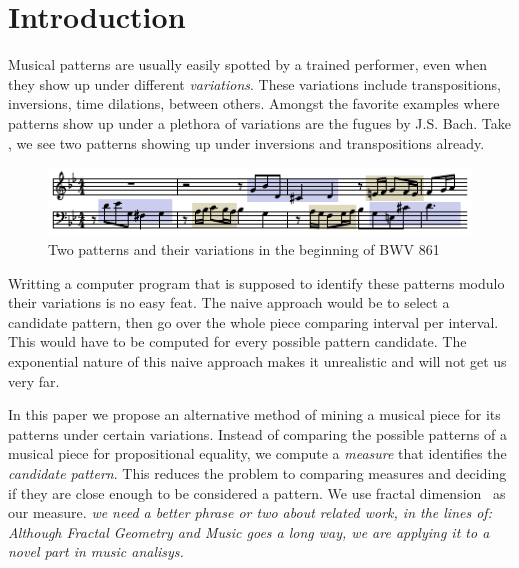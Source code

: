 \newcommand{\victor}[1]{\textit{\color{blue} #1}}

\section{Introduction}
\label{sec:intro}

  Musical patterns are usually easily spotted by a trained performer,
even when they show up under different \emph{variations}.  These
variations include transpositions, inversions, time dilations, between
others. Amongst the favorite examples where patterns show up under a
plethora of variations are the fugues by J.S. Bach. Take
, we see two patterns showing up under
inversions and transpositions already.

\begin{figure}
  \includegraphics[width=\linewidth]{src/img/bwv861-start-section-patterns.pdf}
  \caption{Two patterns and their variations in the beginning of BWV 861}
  \label{fig:egbach}
\end{figure}

  Writting a computer program that is supposed to identify these
patterns modulo their variations is no easy feat. The naive approach
would be to select a candidate pattern, then go over the whole
piece comparing interval per interval. This would have to be computed
for every possible pattern candidate. The exponential nature of this
naive approach makes it unrealistic and will not get us very far.

  In this paper we propose an alternative method of mining a musical
piece for its patterns under certain variations. Instead of comparing 
the possible patterns of a musical piece for propositional equality, 
we compute a \emph{measure} that identifies the \emph{candidate pattern}.
This reduces the problem to comparing measures and deciding if they are
close enough to be considered a pattern. We use fractal dimension~\cite{fractaldimension}
as our measure. \victor{we need a better phrase or two about related
work, in the lines of: Although Fractal Geometry and Music goes a long way\cite{bigerelle2000fractal,hsu1990fractal,hsu1991self},
we are applying it to a novel part in music analisys.}

